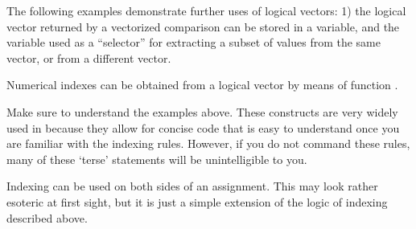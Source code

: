 \documentclass[krantz2]{krantz}\usepackage{knitr}%
\begin{document}
\begin{playground}
The following examples demonstrate further uses of logical vectors: 1) the logical vector returned by a vectorized comparison can be stored in a variable, and the variable used as a ``selector'' for extracting a subset of values from the same vector, or from a different vector.

\begin{knitrout}\footnotesize
{}\color{fgcolor}\begin{kframe}
\begin{alltt}
 \hlkwb{<-} \hlstd{letters[}\hlopt{:}\hlstd{]}
 \hlkwb{<-} \hlopt{:}
 \hlkwb{<-}  \hlopt{>} 
\end{alltt}
\end{kframe}
\end{knitrout}

Numerical indexes can be obtained from a logical vector by means of function .

\begin{knitrout}\footnotesize
{}\color{fgcolor}\begin{kframe}
\begin{alltt}
 \hlkwb{<-}  \hlopt{>} \hlstd{)}
\end{alltt}
\end{kframe}
\end{knitrout}

Make sure to understand the examples above. These constructs are very widely used in \Rlang because they allow for concise code that is easy to understand once you are familiar with the indexing rules. However, if you do not command these rules, many of these `terse' statements will be unintelligible to you.
\end{playground}

Indexing can be used on both sides of an assignment. This may look rather esoteric at first sight, but it is just a simple extension of the logic of indexing described above.
\end{document}
